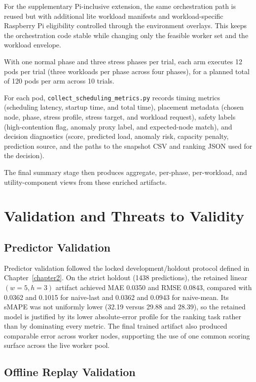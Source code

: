For the supplementary Pi-inclusive extension, the same orchestration path is reused but with additional lite workload manifests and workload-specific Raspberry Pi eligibility controlled through the environment overlays. This keeps the orchestration code stable while changing only the feasible worker set and the workload envelope.

With one normal phase and three stress phases per trial, each arm executes 12 pods per trial (three workloads per phase across four phases), for a planned total of 120 pods per arm across 10 trials.

For each pod, \texttt{collect\_scheduling\_metrics.py} records timing metrics (scheduling latency, startup time, and total time), placement metadata (chosen node, phase, stress profile, stress target, and workload request), safety labels (high-contention flag, anomaly proxy label, and expected-node match), and decision diagnostics (score, predicted load, anomaly risk, capacity penalty, prediction source, and the paths to the snapshot CSV and ranking JSON used for the decision).

The final summary stage then produces aggregate, per-phase, per-workload, and utility-component views from these enriched artifacts.

\section{Validation and Threats to Validity}

\subsection{Predictor Validation}

Predictor validation followed the locked development/holdout protocol defined in Chapter~\ref{chapter2}. On the strict holdout (1438 predictions), the retained linear \((w{=}5, h{=}3)\) artifact achieved MAE 0.0350 and RMSE 0.0843, compared with 0.0362 and 0.1015 for naive-last and 0.0362 and 0.0943 for naive-mean. Its sMAPE was not uniformly lower (32.19 versus 29.88 and 28.39), so the retained model is justified by its lower absolute-error profile for the ranking task rather than by dominating every metric. The final trained artifact also produced comparable error across worker nodes, supporting the use of one common scoring surface across the live worker pool.


\subsection{Offline Replay Validation}

